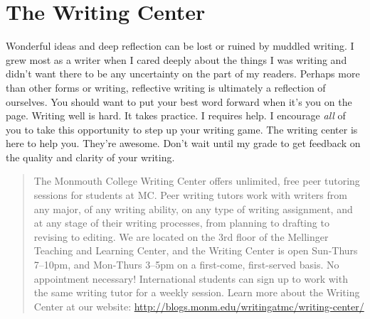 \documentclass[nobib]{tufte-handout}
\begin{document}
\section{The Writing Center}

Wonderful ideas and deep reflection can be lost or ruined by muddled writing.  I grew most as a writer when I cared deeply about the things I was writing and didn't want there to be any uncertainty on the part of my readers. Perhaps more than other forms or writing, reflective writing is ultimately a reflection of ourselves. You should want to put your best word forward when it's you on the page. Writing well is hard. It takes practice. I requires help. I encourage \textit{all} of you to take this opportunity to step up your writing game. The writing center is here to help you. They're awesome. Don't wait until my grade to get feedback on the quality and clarity of your writing.
\begin{quote}
The Monmouth College Writing Center offers unlimited, free peer tutoring sessions for students at MC\@.  Peer writing tutors work with writers from any major, of any writing ability, on any type of writing assignment, and at any stage of their writing processes, from planning to drafting to revising to editing.  We are located on the 3rd floor of the Mellinger Teaching and Learning Center, and the Writing Center is open Sun-Thurs 7--10pm, and Mon-Thurs 3--5pm on a first-come, first-served basis.  No appointment necessary!  International students can sign up to work with the same writing tutor for a weekly session. Learn more about the Writing Center at our website: \url{http://blogs.monm.edu/writingatmc/writing-center/}
\end{quote}
\end{document}
